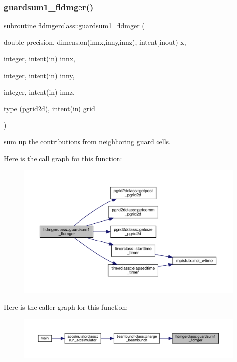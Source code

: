 \subsubsection{\texorpdfstring{guardsum1\_fldmger()}{guardsum1\_fldmger()}}
{\footnotesize\ttfamily subroutine fldmgerclass\+::guardsum1\+\_\+fldmger (\begin{DoxyParamCaption}\item[{double precision, dimension(innx,inny,innz), intent(inout)}]{x,  }\item[{integer, intent(in)}]{innx,  }\item[{integer, intent(in)}]{inny,  }\item[{integer, intent(in)}]{innz,  }\item[{type (pgrid2d), intent(in)}]{grid }\end{DoxyParamCaption})}



sum up the contributions from neighboring guard cells. 

Here is the call graph for this function\+:\nopagebreak
\begin{figure}[H]
\begin{center}
\leavevmode
\includegraphics[width=350pt]{namespacefldmgerclass_a54886b0763b8458a0560ccf7087b07f1_cgraph}
\end{center}
\end{figure}
Here is the caller graph for this function\+:\nopagebreak
\begin{figure}[H]
\begin{center}
\leavevmode
\includegraphics[width=350pt]{namespacefldmgerclass_a54886b0763b8458a0560ccf7087b07f1_icgraph}
\end{center}
\end{figure}

